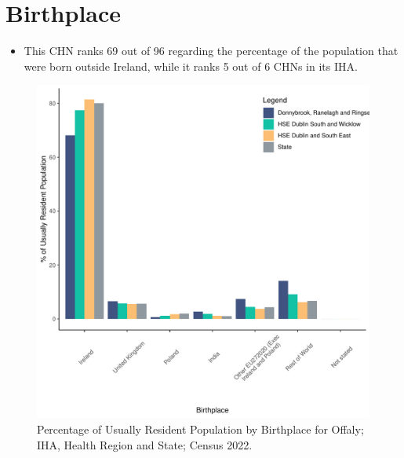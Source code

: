 \documentclass{article}
\begin{document}
\section{Birthplace}\label{sect:Birth}
\begin{itemize}
\item This CHN ranks  69 out of 96 regarding the percentage of the population that were born outside Ireland, while it ranks  5 out of 6 CHNs in its IHA.
\end{itemize}
\begin{figure}[H]
	\centering
	\includegraphics[width = 130mm]{../figures/BirthED.pdf}
	\caption{Percentage of Usually Resident Population by Birthplace for Offaly; IHA, Health Region and State; Census 2022.}
	\label{fig:vbnv}
	\end{figure}
	
\end{document}
